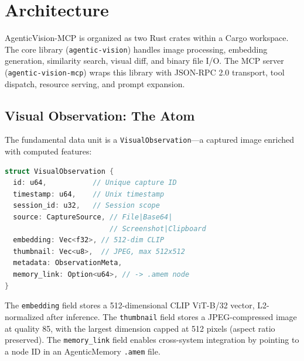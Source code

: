\documentclass[10pt, twocolumn]{article}
\begin{document}
\section{Architecture}
\label{sec:arch}

AgenticVision-MCP is organized as two Rust crates within a Cargo workspace. The core library (\texttt{agentic-vision}) handles image processing, embedding generation, similarity search, visual diff, and binary file I/O. The MCP server (\texttt{agentic-vision-mcp}) wraps this library with JSON-RPC 2.0 transport, tool dispatch, resource serving, and prompt expansion.

\subsection{Visual Observation: The Atom}

The fundamental data unit is a \texttt{VisualObservation}---a captured image enriched with computed features:

\begin{lstlisting}[language=C, caption={VisualObservation structure (simplified from Rust).}]
struct VisualObservation {
  id: u64,           // Unique capture ID
  timestamp: u64,    // Unix timestamp
  session_id: u32,   // Session scope
  source: CaptureSource, // File|Base64|
                         // Screenshot|Clipboard
  embedding: Vec<f32>, // 512-dim CLIP
  thumbnail: Vec<u8>,  // JPEG, max 512x512
  metadata: ObservationMeta,
  memory_link: Option<u64>, // -> .amem node
}
\end{lstlisting}

The \texttt{embedding} field stores a 512-dimensional CLIP ViT-B/32 vector, L2-normalized after inference. The \texttt{thumbnail} field stores a JPEG-compressed image at quality 85, with the largest dimension capped at 512 pixels (aspect ratio preserved). The \texttt{memory\_link} field enables cross-system integration by pointing to a node ID in an AgenticMemory \texttt{.amem} file.
\end{document}
